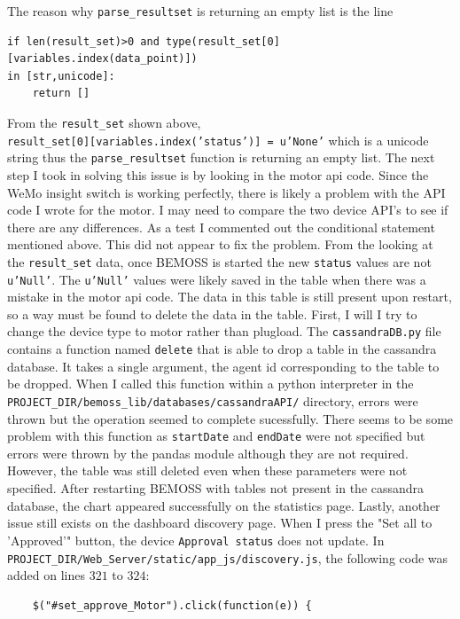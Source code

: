\documentclass[fontsize=11pt, %
                             paper=letter, %
                             twoside, %
                             captions=tableheading,
                             index=totoc,
                             hyperref]{labbook}
\begin{document}
\begin{addmargin}[0cm]{0cm}
\bigbreak\noindent
The reason why \texttt{parse\_resultset} is returning an empty list is the line
\begin{verbatim}
if len(result_set)>0 and type(result_set[0][variables.index(data_point)]) 
in [str,unicode]:
	return []
\end{verbatim}
From the \texttt{result\_set} shown above,\\ 
\texttt{result\_set[0][variables.index('status')] = u'None'} which is a unicode string thus the \texttt{parse\_resultset} function is returning an empty list. The next step I took in solving this issue is by looking in the motor api code. Since the WeMo insight switch is working perfectly, there is likely a problem with the API code I wrote for the motor. I may need to compare the two device API's to see if there  are any differences. As a test I commented out the conditional statement mentioned above. This did not appear to fix the problem. From the looking at the \texttt{result\_set} data, once BEMOSS is started the new \texttt{status} values are not \texttt{u'Null'}. The \texttt{u'Null'} values were likely saved in the table when there was a mistake in the motor api code. The data in this table is still present upon restart, so a way must be found to delete the data in the table. First, I will I try to change the device type to motor rather than plugload.
\bigbreak\noindent
The \texttt{cassandraDB.py} file contains a function named \texttt{delete} that is able to drop a table in the cassandra database. It takes a single argument, the agent id corresponding to the table to be dropped. When I called this function within a python interpreter in the \texttt{PROJECT\_DIR/bemoss\_lib/databases/cassandraAPI/} directory, errors were thrown but the operation seemed to complete sucessfully. There seems to be some problem with this function as \texttt{startDate} and \texttt{endDate} were not specified but errors were thrown by the pandas module although they are not required. However, the table was still deleted even when these parameters were not specified. After restarting BEMOSS with tables not present in the cassandra database, the chart appeared successfully on the statistics page. Lastly, another issue still exists on the dashboard discovery page. When I press the "Set all to 'Approved'" button, the device \texttt{Approval status} does not update. In \texttt{PROJECT\_DIR/Web\_Server/static/app\_js/discovery.js},  the following code was added on lines $321$ to $324$: 
\begin{verbatim}
    $("#set_approve_Motor").click(function(e)) {

\end{verbatim}
\end{addmargin}
\end{document}

